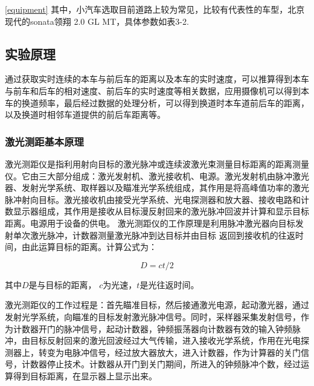 \autoref{equipment}
其中，小汽车选取目前道路上较为常见，比较有代表性的车型，北京现代的sonata领翔 2.0 GL MT，具体参数如表3-2.

\subsection{实验原理}
通过获取实时连续的本车与前后车的距离以及本车的实时速度，可以推算得到本车与前车和后车的相对速度、前后车的实时速度等相关数据，应用摄像机可以得到本车的换道频率，最后经过数据的处理分析，可以得到换道时本车道前后车的距离，以及换道时相邻车道提供的前后车距离等。
\subsubsection{激光测距基本原理}
激光测距仪是指利用射向目标的激光脉冲或连续波激光束测量目标距离的距离测量仪。它由三大部分组成：激光发射机、激光接收机、电源。激光发射机由脉冲激光器、发射光学系统、取样器以及瞄准光学系统组成，其作用是将高峰值功率的激光脉冲射向目标。激光接收机由接受光学系统、光电探测器和放大器、接收电路和计数显示器组成，其作用是接收从目标漫反射回来的激光脉冲回波并计算和显示目标距离。电源用于设备的供电。
激光测距仪的工作原理是利用脉冲激光器向目标发射单次激光脉冲，计数器测量激光脉冲到达目标并由目标 返回到接收机的往返时间，由此运算目标的距离。计算公式为：

\begin{equation}
D = ct/2
\end{equation}

其中$D$是与目标的距离， $c$为光速，$t$是光往返时间。

激光测距仪的工作过程是：首先瞄准目标，然后接通激光电源，起动激光器，通过发射光学系统，向瞄准的目标发射激光脉冲信号。同时，采样器采集发射信号，作为计数器开门的脉冲信号，起动计数器，钟频振荡器向计数器有效的输入钟频脉冲，由目标反射回来的激光回波经过大气传输，进入接收光学系统，作用在光电探测器上，转变为电脉冲信号，经过放大器放大，进入计数器，作为计算器的关门信号，计数器停止技术。计数器从开门到关门期间，所进入的钟频脉冲个数，经过运算得到目标距离，在显示器上显示出来。


